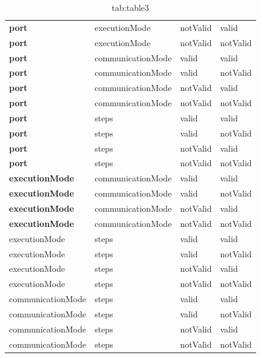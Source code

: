 \begin{table}[H]
\begin{tabular}{llll}
        \textbf{port}          & executionMode     & notValid        & valid           \\
        \textbf{port}          & executionMode     & notValid        & notValid        \\
        \textbf{port}          & communicationMode & valid           & valid           \\
        \textbf{port}          & communicationMode & valid           & notValid        \\
        \textbf{port}          & communicationMode & notValid        & valid           \\
        \textbf{port}          & communicationMode & notValid        & notValid        \\
        \textbf{port}          & steps             & valid           & valid           \\
        \textbf{port}          & steps             & valid           & notValid        \\
        \textbf{port}          & steps             & notValid        & valid           \\
        \textbf{port}          & steps             & notValid        & notValid        \\
        \textbf{executionMode} & communicationMode & valid           & valid           \\
        \textbf{executionMode} & communicationMode & valid           & notValid        \\
        \textbf{executionMode} & communicationMode & notValid        & valid           \\
        \textbf{executionMode} & communicationMode & notValid        & notValid        \\
        executionMode          & steps             & valid           & valid           \\
        executionMode          & steps             & valid           & notValid        \\
        executionMode          & steps             & notValid        & valid           \\
        executionMode          & steps             & notValid        & notValid        \\
        communicationMode      & steps             & valid           & valid           \\
        communicationMode      & steps             & valid           & notValid        \\
        communicationMode      & steps             & notValid        & valid           \\
        communicationMode      & steps             & notValid        & notValid
    \end{tabular}
    \caption{tab:table3}\label{tab:table3}
\end{table}

